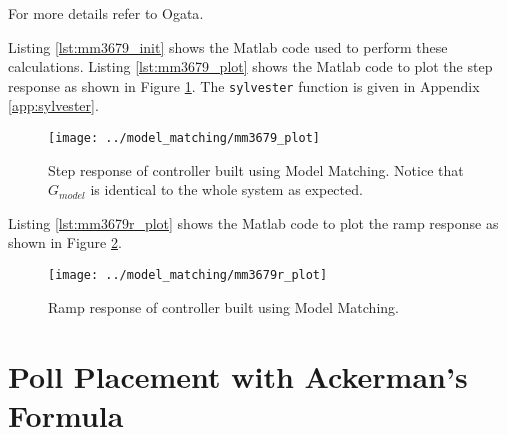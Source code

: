 \documentclass{article}
\newcommand{\sincludepdf}[2][]{
	
}
\begin{document}
For more details refer to Ogata\autocite[Pg. 532]{ogata1995discrete}.

\sincludepdf[pages=1,
			pagecommand=\subsection*{Example 1}
	]{scan/11261301.pdf}
\sincludepdf[pages=2-4]{scan/11261301.pdf}

\clearpage
Listing \ref{lst:mm3679_init} shows the Matlab code used to perform
these calculations.
Listing \ref{lst:mm3679_plot} shows the Matlab code to plot the step response
as shown in Figure \ref{fig:mm3679_plot}.
The \verb+sylvester+ function is given in Appendix \ref{app:sylvester}.



\clearpage


\begin{figure}
\begin{center}
\texttt{[image: ../model\_matching/mm3679\_plot]}
\end{center}
\caption{Step response of controller built using Model Matching.
Notice that $G_{model}$ is identical to the whole system as expected.}
\label{fig:mm3679_plot}
\end{figure}

\clearpage
Listing \ref{lst:mm3679r_plot} shows the Matlab code to plot the ramp response
as shown in Figure \ref{fig:mm3679r_plot}.



\begin{figure}
\begin{center}
\texttt{[image: ../model\_matching/mm3679r\_plot]}
\end{center}
\caption{Ramp response of controller built using Model Matching.}
\label{fig:mm3679r_plot}
\end{figure}



\clearpage
\section{Poll Placement with Ackerman's Formula}
\end{document}
